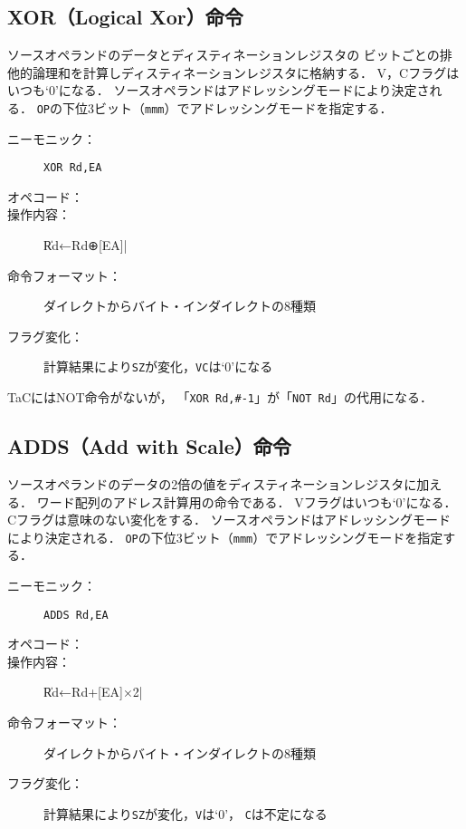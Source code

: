 \subsection{XOR（Logical Xor）命令}
ソースオペランドのデータとディスティネーションレジスタの
ビットごとの排他的論理和を計算しディスティネーションレジスタに格納する．
V，Cフラグはいつも`0'になる．
ソースオペランドはアドレッシングモードにより決定される．
\texttt{OP}の下位3ビット（\texttt{mmm}）でアドレッシングモードを指定する．

\begin{description}
\item[ニーモニック：] \texttt{XOR Rd,EA}
\item[オペコード：] 
\item[操作内容：] \|Rd←Rd⊕[EA]|
\item[命令フォーマット：] ダイレクトからバイト・インダイレクトの8種類
\item[フラグ変化：] 計算結果により\texttt{SZ}が変化，\texttt{VC}は`0'になる
\end{description}

TaCにはNOT命令がないが，
「\texttt{XOR Rd,\#-1}」が「\texttt{NOT Rd}」の代用になる．

\subsection{ADDS（Add with Scale）命令}
ソースオペランドのデータの2倍の値をディスティネーションレジスタに加える．
ワード配列のアドレス計算用の命令である．
Vフラグはいつも`0'になる．
Cフラグは意味のない変化をする．
ソースオペランドはアドレッシングモードにより決定される．
\texttt{OP}の下位3ビット（\texttt{mmm}）でアドレッシングモードを指定する．

\begin{description}
\item[ニーモニック：] \texttt{ADDS Rd,EA}
\item[オペコード：] 
\item[操作内容：] \|Rd←Rd+[EA]×2|
\item[命令フォーマット：] ダイレクトからバイト・インダイレクトの8種類
\item[フラグ変化：] 計算結果により\texttt{SZ}が変化，\texttt{V}は`0'，
\texttt{C}は不定になる
\end{description}

